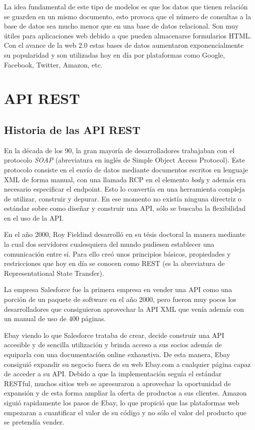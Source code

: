 La idea fundamental de este tipo de modelos es que los datos que tienen relación se guarden en un mismo documento, esto provoca que el número de consultas a la base de datos sea mucho menor que en una base de datos relacional. Son muy útiles para aplicaciones web debido a que pueden almacenarse formularios HTML. Con el avance de la web 2.0 estas bases de datos aumentaron exponencialmente su popularidad y son utilizadas hoy en día por plataformas como Google, Facebook, Twitter, Amazon, etc.

\newpage
\section{API REST}

\subsection{Historia de las API REST}

En la década de los 90, la gran mayoría de desarrolladores trabajaban con el protocolo \textit{SOAP} (abreviatura en inglés de Simple Object Access Protocol). Este protocolo consiste en el envío de datos mediante documentos escritos en lenguaje XML de forma manual, con una llamada RCP en el elemento \textit{body} y además era necesario especificar el endpoint. Esto lo convertía en una herramienta compleja de utilizar, construir y depurar. En ese momento no existía ninguna directriz o estándar sobre como diseñar y construir una API, sólo se buscaba la flexibilidad en el uso de la API.

En el año 2000, Roy Fieldind desarrolló en su tésis doctoral la manera mediante la cual dos servidores cualesquiera del mundo pudiesen establecer una comunicación entre sí. Para ello creó unos principios básicos, propiedades y restricciones que hoy en día se conocen como REST (es la abreviatura de Representational State Transfer). 

La empresa Salesforce fue la primera empresa en vender una API como una porción de un paquete de software en el año 2000, pero fueron muy pocos los desarrolladores que consiguieron aprovechar la API XML que venía además con un manual de uso de 400 páginas. 

Ebay viendo lo que Salesforce trataba de crear, decide construir una API accesible y de sencilla utilización y brinda acceso a sus socios además de equiparla con una documentación online exhaustiva. De esta manera, Ebay consiguió expandir su negocio fuera de su web Ebay.com a cualquier página capaz de acceder a su API. Debido a que la implementación seguía el estándar RESTful, muchos sitios web se apresuraron a aprovechar la oportunidad de expansión y de esta forma ampliar la oferta de productos a sus clientes. Amazon siguió rapidamente los pasos de Ebay, lo que propició que las plataformas web empezaran a cuantificar el valor de su código y no sólo el valor del producto que se pretendía vender. 

